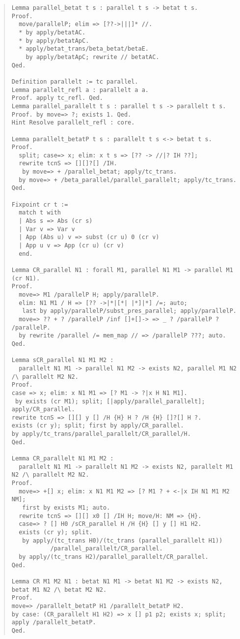 \documentclass[12pt, titlepage]{ltjsarticle}
\begin{document}
\begin{quote}
\begin{verbatim}
Lemma parallel_betat t s : parallel t s -> betat t s.
Proof.
  move/parallelP; elim => [??->|||]* //.
  * by apply/betatAC.
  * by apply/betatApC.
  * apply/betat_trans/beta_betat/betaE.
    by apply/betatApC; rewrite // betatAC.
Qed.

Definition parallelt := tc parallel.
Lemma parallelt_refl a : parallelt a a.
Proof. apply tc_refl. Qed.
Lemma parallel_parallelt t s : parallel t s -> parallelt t s.
Proof. by move=> ?; exists 1. Qed.
Hint Resolve parallelt_refl : core.

Lemma parallelt_betatP t s : parallelt t s <-> betat t s.
Proof.
  split; case=> x; elim: x t s => [?? -> //|? IH ??];
  rewrite tcnS => [][]?[] /IH.
   by move=> + /parallel_betat; apply/tc_trans.
  by move=> + /beta_parallel/parallel_parallelt; apply/tc_trans.
Qed.

Fixpoint cr t :=
  match t with
  | Abs s => Abs (cr s)
  | Var v => Var v
  | App (Abs u) v => subst (cr u) 0 (cr v)
  | App u v => App (cr u) (cr v)
  end.

Lemma CR_parallel N1 : forall M1, parallel N1 M1 -> parallel M1 (cr N1).
Proof.
  move=> M1 /parallelP H; apply/parallelP.
  elim: N1 M1 / H => [?? ->|*|[*| |*]|*] /=; auto;
   last by apply/parallelP/subst_pres_parallel; apply/parallelP.
  move=> ?? + ? /parallelP /inf []+[]-> => _ ? /parallelP ? /parallelP.
  by rewrite /parallel /= mem_map // => /parallelP ???; auto.
Qed.

Lemma sCR_parallel N1 M1 M2 :
  parallelt N1 M1 -> parallel N1 M2 -> exists N2, parallel M1 N2 /\ parallelt M2 N2.
Proof.
case => x; elim: x N1 M1 => [? M1 -> ?|x H N1 M1].
 by exists (cr M1); split; [|apply/parallel_parallelt]; apply/CR_parallel.
rewrite tcnS => [][] y [] /H {H} H ? /H {H} []?[] H ?.
exists (cr y); split; first by apply/CR_parallel.
by apply/tc_trans/parallel_parallelt/CR_parallel/H.
Qed.

Lemma CR_parallelt N1 M1 M2 :
  parallelt N1 M1 -> parallelt N1 M2 -> exists N2, parallelt M1 N2 /\ parallelt M2 N2.
Proof.
  move=> +[] x; elim: x N1 M1 M2 => [? M1 ? + <-|x IH N1 M1 M2 NM];
   first by exists M1; auto.
  rewrite tcnS => [][] x0 [] /IH H; move/H: NM => {H}.
  case=> ? [] H0 /sCR_parallel H /H {H} [] y [] H1 H2.
  exists (cr y); split.
   by apply/(tc_trans H0)/(tc_trans (parallel_parallelt H1))
           /parallel_parallelt/CR_parallel.
  by apply/(tc_trans H2)/parallel_parallelt/CR_parallel.
Qed.

Lemma CR M1 M2 N1 : betat N1 M1 -> betat N1 M2 -> exists N2, betat M1 N2 /\ betat M2 N2.
Proof.
move=> /parallelt_betatP H1 /parallelt_betatP H2.
by case: (CR_parallelt H1 H2) => x [] p1 p2; exists x; split; apply /parallelt_betatP.
Qed.
\end{verbatim}
\end{quote}
\end{document}
